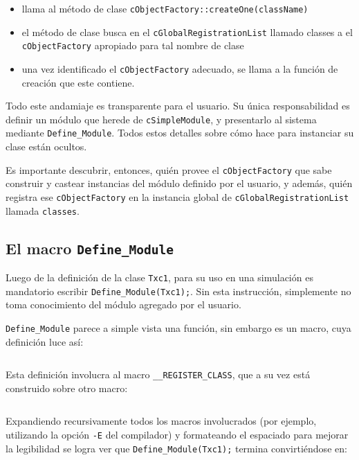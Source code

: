 \begin{itemize}
    \item llama al método de clase \verb!cObjectFactory::createOne(className)!

    \item el método de clase busca en el \verb!cGlobalRegistrationList! llamado
classes a el \verb!cObjectFactory! apropiado para tal nombre de clase

    \item una vez identificado el \verb!cObjectFactory! adecuado, se llama a la
función de creación que este contiene.

\end{itemize}

Todo este andamiaje es transparente para el usuario. Su única responsabilidad
es definir un módulo que herede de \verb!cSimpleModule!, y presentarlo al
sistema mediante \verb!Define_Module!. Todos estos detalles sobre cómo hace
\omnetpp{} para instanciar su clase están ocultos.

Es importante descubrir, entonces, quién provee el \verb!cObjectFactory! que
sabe construir y castear instancias del módulo definido por el usuario, y
además, quién registra ese \verb!cObjectFactory! en la instancia global de
\verb!cGlobalRegistrationList! llamada \verb!classes!.

\subsection{El macro \texttt{Define\_Module}}

Luego de la definición de la clase \verb!Txc1!, para su uso en una simulación
es mandatorio escribir \verb!Define_Module(Txc1);!. Sin esta instrucción,
\omnetpp{} simplemente no toma conocimiento del módulo agregado por el usuario.

\verb!Define_Module! parece a simple vista una función, sin embargo es un
macro, cuya definición luce así:

\inputminted{c++}{codelistings/define_module_1.cc}

Esta definición involucra al macro \verb!__REGISTER_CLASS!, que a su vez está
construido sobre otro macro:

\inputminted{c++}{codelistings/define_module_2.cc}

Expandiendo recursivamente todos los macros involucrados (por ejemplo,
utilizando la opción \verb!-E! del compilador) y formateando el espaciado para
mejorar la legibilidad se logra ver que \verb!Define_Module(Txc1);! termina
convirtiéndose en:


